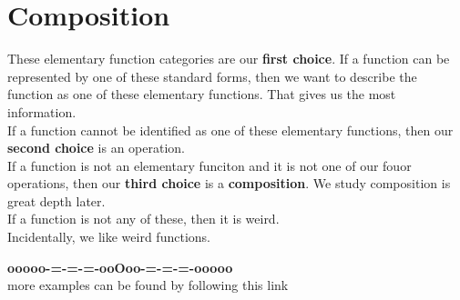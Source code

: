 \documentclass{ximera}
\begin{document}
\section*{Composition}


These elementary function categories are our \textbf{first choice}.  If a function can be represented by one of these standard forms, then we want to describe the function as one of these elementary functions.  That gives us the most information. \\


If a function cannot be identified as one of these elementary functions, then our \textbf{second choice} is an operation. \\


If a function is not an elementary funciton and it is not one of our fouor operations, then our \textbf{third choice} is a \textbf{\textcolor{purple!85!blue}{composition}}.  We study composition is great depth later. \\


If a function is not any of these, then it is weird. \\

Incidentally, we like weird functions.



















\begin{center}
\textbf{\textcolor{green!50!black}{ooooo-=-=-=-ooOoo-=-=-=-ooooo}} \\

more examples can be found by following this link\\ 

\end{center}
\end{document}
